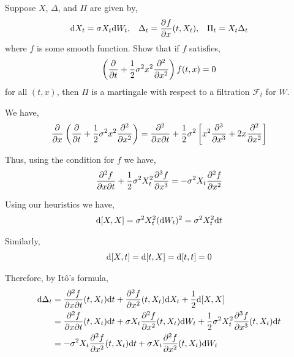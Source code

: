 \pagebreak
\begin{problem}[Exercise 8.3]
Suppose \( X \), \( \Delta \), and \( \Pi \) are given by,
\begin{align*}
    \d X_t = \sigma X_t \d W_t, 
    && \Delta_t = \pp{f}{x} (t,X_t),
    && \Pi_t = X_t \Delta_t
\end{align*}
where \( f \) is some smooth function. Show that if \( f \) satisfies,
\begin{align*}
    \left( \pp{}{t} + \dfrac{1}{2}\sigma^2x^2 \pp[2]{}{x} \right) f(t,x) = 0
\end{align*}
    for all \( (t,x) \), then \( \Pi \) is a martingale with respect to a filtration \( \mathcal{F}_t \) for \( W \).
\end{problem}


\begin{solution}[Solution]
We have,
\begin{align*}
    \pp{}{x} \left( \pp{}{t} + \dfrac{1}{2}\sigma^2x^2 \pp[2]{}{x}\right)  
    = \dfrac{\partial^2}{\partial x\partial t} + \dfrac{1}{2}\sigma^2 \left[ x^2 \pp[3]{}{x} + 2x \pp[2]{}{x} \right]
\end{align*}

Thus, using the condition for \( f \) we have,
\begin{align*}
    \dfrac{\partial^2 f}{\partial x\partial t} + \dfrac{1}{2}\sigma^2 X_t^2 \pp[3]{f}{x} = - \sigma^2 X_t \pp[2]{f}{x}
\end{align*}

Using our heuristics we have,
\begin{align*}
    \d[X,X] = \sigma^2 X_t^2 (\d W_t)^2 = \sigma^2 X_t^2 \d t
\end{align*}

Similarly, 
\begin{align*}
    \d[X,t] = \d[t,X] = \d[t,t] = 0
\end{align*}

Therefore, by It\^o's formula,
\begin{align*}
    \d \Delta_t &= \dfrac{\partial^2 f}{\partial x\partial t}(t,X_t) \d t + \pp[2]{f}{x}(t,X_t) \d X_t + \dfrac{1}{2} \d[X,X]
    \\&=  \dfrac{\partial^2 f}{\partial x\partial t}(t,X_t) \d t + \sigma X_t \pp[2]{f}{x}(t,X_t) \d W_t + \dfrac{1}{2}\sigma^2X_t^2 \pp[3]{f}{x}(t,X_t) \d t
    \\&= -\sigma^2 X_t \pp[2]{f}{x}(t,X_t) \d t + \sigma X_t \pp[2]{f}{x}(t,X_t)\d W_t 
\end{align*}


\end{solution}
